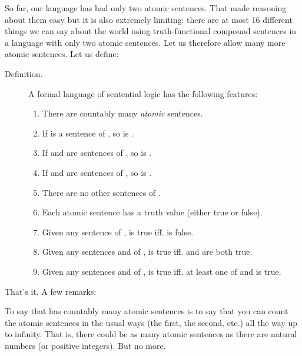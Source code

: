 So far, our language \lL[S]{} has had only two atomic sentences. That made reasoning 
about them easy but it is also extremely limiting: there are at most 16 
different things we can say about the world using truth-functional compound 
sentences in a language with only two atomic sentences. Let us therefore allow 
many more atomic sentences.  Let us define:


\begin{description}
\item[Definition.]  A formal language \lL{}{} of sentential logic has the 
 following features:
\begin{enumerate}

 \item There are countably many \emph{atomic} sentences.

 \item If  is a sentence of \lL{}, so is .

 \item If  and  are sentences of \lL{}, so is .

 \item If  and  are sentences of \lL{}, so is .

 \item There are no other sentences of \lL{}.

 \item Each atomic sentence has a truth value (either true or false).

 \item Given any sentence  of \lL{},   is true iff.  is 
  false.

 \item Given any sentences  and  of \lL{},  is 
  true iff.  and  are both true.

 \item Given any sentences  and  of \lL{},  is 
  true iff. at least one of  and  is true.


\end{enumerate}
\end{description}
That's it. A few remarks:

To say that \lL{} has countably many atomic sentences is to say that you can count 
the atomic sentences in the usual ways (the first, the second, etc.) all the way 
up to infinity. That is, there could be as many atomic sentences as there are 
natural numbers (or positive integers). But no more.

